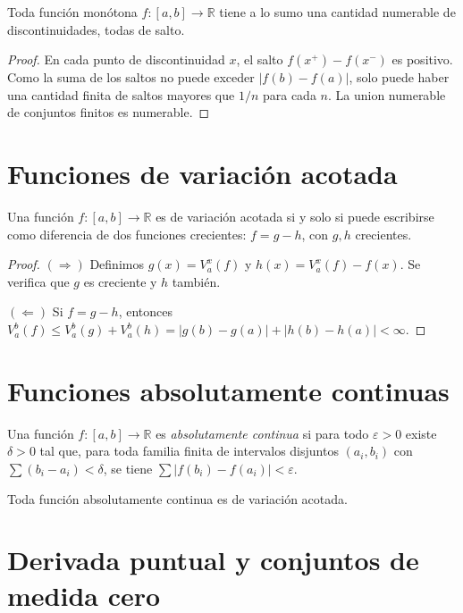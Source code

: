 \begin{theorem}
\label{teo:monotona-discontinuidades}
Toda función monótona $f\colon[a,b]\to\mathbb{R}$ tiene a lo sumo una cantidad numerable de discontinuidades, todas de salto.
\end{theorem}
\begin{proof}
En cada punto de discontinuidad $x$, el salto $f(x^+)-f(x^-)$ es positivo. Como la suma de los saltos no puede exceder $|f(b)-f(a)|$, solo puede haber una cantidad finita de saltos mayores que $1/n$ para cada $n$. La union numerable de conjuntos finitos es numerable.
\end{proof}

\section{Funciones de variación acotada}

\begin{theorem}[Jordan]
\label{teo:jordan}
Una función $f\colon[a,b]\to\mathbb{R}$ es de variación acotada si y solo si puede escribirse como diferencia de dos funciones crecientes: $f=g-h$, con $g,h$ crecientes.
\end{theorem}
\begin{proof}
$(\Rightarrow)$ Definimos $g(x)=V_a^x(f)$ y $h(x)=V_a^x(f)-f(x)$. Se verifica que $g$ es creciente y $h$ también.

$(\Leftarrow)$ Si $f=g-h$, entonces $V_a^b(f)\leq V_a^b(g)+V_a^b(h)=|g(b)-g(a)|+|h(b)-h(a)|<\infty$.
\end{proof}

\section{Funciones absolutamente continuas}

\begin{definition}
\label{def:absolutamente-continua}
Una función $f\colon[a,b]\to\mathbb{R}$ es \emph{absolutamente continua} si para todo $\varepsilon>0$ existe $\delta>0$ tal que, para toda familia finita de intervalos disjuntos $(a_i,b_i)$ con $\sum(b_i-a_i)<\delta$, se tiene $\sum|f(b_i)-f(a_i)|<\varepsilon$.
\end{definition}

\begin{proposition}
\label{prop:ac-implica-va}
Toda función absolutamente continua es de variación acotada.
\end{proposition}

\section{Derivada puntual y conjuntos de medida cero}

